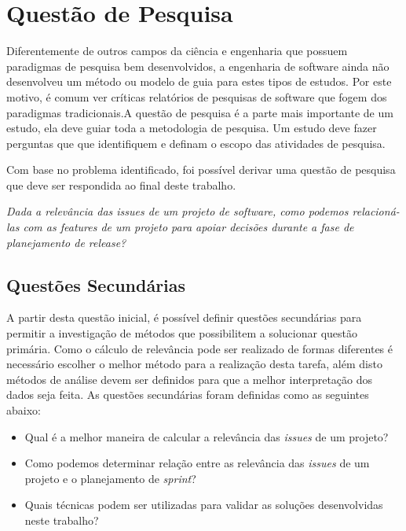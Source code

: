 \section{Questão de Pesquisa}
\label{int:que}

Diferentemente de outros campos da ciência e engenharia que possuem paradigmas de pesquisa bem desenvolvidos, a engenharia de software ainda não desenvolveu um método ou modelo de guia para estes tipos de estudos. Por este motivo, é comum ver críticas relatórios de pesquisas de software que fogem dos paradigmas tradicionais\cite{shaw}.A questão de pesquisa é a parte mais importante de um estudo, ela deve guiar toda a metodologia de pesquisa. Um estudo deve fazer perguntas que que identifiquem e definam o escopo das atividades de pesquisa\cite{guidelines}.

Com base no problema identificado, foi possível derivar uma questão de pesquisa que deve ser respondida ao final deste trabalho.

\begin{center}
    \textit{Dada a relevância das \textit{issues} de um projeto de software, como podemos relacioná-las com as \textit{features} de um projeto para apoiar decisões durante a fase de planejamento de \textit{release}?}
\end{center}

\subsection{Questões Secundárias}
\label{int:que:sec}

A partir desta questão inicial, é possível definir questões secundárias para permitir a investigação de métodos que possibilitem a solucionar questão primária. Como o cálculo de relevância pode ser realizado de formas diferentes é necessário escolher o melhor método para a realização desta tarefa, além disto métodos de análise devem ser definidos para que a melhor interpretação dos dados seja feita. As questões secundárias foram definidas como as seguintes abaixo:

\begin{itemize}
    \item Qual é a melhor maneira de calcular a relevância das \textit{issues} de um projeto?
    \item Como podemos determinar relação entre as relevância das \textit{issues} de um projeto e o planejamento de \textit{sprint}?
    \item Quais técnicas podem ser utilizadas para validar as soluções desenvolvidas neste trabalho?
\end{itemize}


